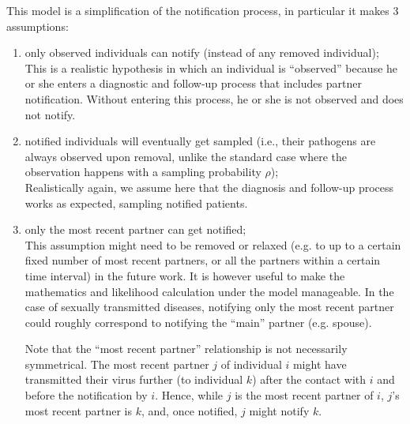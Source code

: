 \documentclass[10pt,letterpaper]{article}
\begin{document}
This model is a simplification of the notification process, in particular it makes 3 assumptions:
\begin{enumerate}
\item only observed individuals can notify (instead of any removed individual);\\

This is a realistic hypothesis in which an individual is ``observed'' because he or she enters a diagnostic and follow-up process that includes partner notification. Without entering this process, he or she is not observed and does not notify.

\item notified individuals will eventually get sampled (i.e., their pathogens are always observed upon removal, unlike the standard case where the observation happens with a sampling probability $\rho$);\\

Realistically again, we assume here that the diagnosis and follow-up process works as expected, sampling notified patients.

%

\item only the most recent partner can get notified;\\

This assumption might need to be removed or relaxed (e.g. to up to a certain fixed number of most recent partners, or all the partners within a certain time interval) in the future work. It is however useful to make the mathematics and likelihood calculation under the model manageable. In the case of sexually transmitted diseases, notifying only the most recent partner could roughly correspond to notifying the ``main'' partner (e.g. spouse).

Note that the ``most recent partner'' relationship is not necessarily symmetrical. The most recent partner $j$ of individual $i$ might have transmitted their virus further (to individual $k$) after the contact with $i$ and before the notification by $i$. Hence, while $j$ is the most recent partner of $i$, $j$'s most recent partner is $k$, and, once notified, $j$ might notify $k$.  
\end{enumerate}
\end{document}
